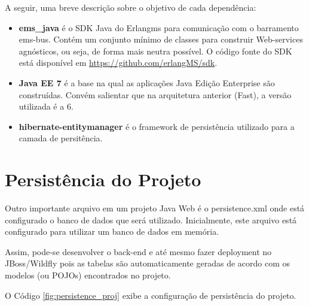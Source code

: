 A seguir, uma breve descrição sobre o objetivo de cada dependência:
	
\begin{itemize}

\item{\bf ems\_java} é o SDK Java do Erlangms para comunicação com o barramento ems-bus. 
Contém um conjunto mínimo de classes para construir Web-services agnósticos, ou seja, 
de forma mais neutra possível. O código fonte do SDK está 
disponível em \url{https://github.com/erlangMS/sdk}.

\item{\bf Java EE 7} é a base na qual as aplicações Java Edição Enterprise são construídas. 
Convém salientar que na arquitetura anterior (Fast), a versão utilizada é a 6. 

\item{\bf hibernate-entitymanager} é o framework de persistência utilizado para a camada
de persitência. 

\end{itemize}



\section{Persistência do Projeto}

Outro importante arquivo em um projeto Java Web é o 
persistence.xml onde está configurado o banco de dados
que será utilizado. Inicialmente, 
este arquivo está configurado para utilizar
um banco de dados em memória. 

Assim, pode-se desenvolver o back-end e
até mesmo fazer deployment no JBoss/Wildfly pois as tabelas são automaticamente geradas de acordo 
com os modelos (ou POJOs) encontrados no projeto.

O Código \ref{fig:persistence_proj} exibe a configuração de persistência do projeto.



